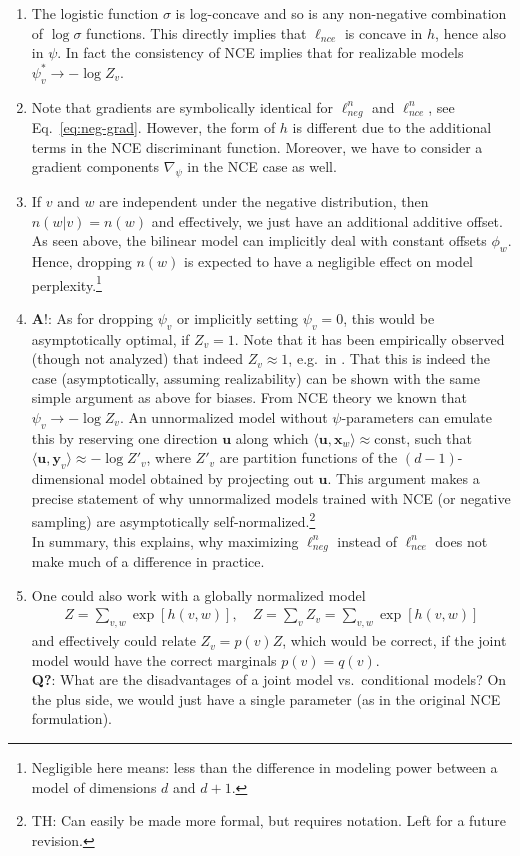 \documentclass{article}
\newcommand{\x}{{\mathbf x}}
\newcommand{\y}{{\mathbf y}}
\newcommand{\textbred}[1]{{\color{Red} \textbf #1}}
\begin{document}
\begin{enumerate}
\item The logistic function $\sigma$ is log-concave and so is any non-negative combination of $\log \sigma$ functions. This directly implies that $\ell_{nce}$ is concave in $h$, hence also in $\psi$. In fact the consistency of NCE  implies that for realizable models $\psi^*_v \to -\log Z_v$. 
\item Note that gradients are symbolically identical for $\ell^n_{neg}$ and $\ell^n_{nce}$, see Eq.~\eqref{eq:neg-grad}. However, the form of $h$ is different due to the additional terms in the NCE discriminant function. Moreover, we have to consider a gradient components $\nabla_\psi$ in the NCE case as well.
\item If $v$ and $w$ are independent under the negative distribution, then $n(w|v) = n(w)$ and effectively, we just have an additional additive offset.  As seen above, the bilinear model can implicitly deal with constant offsets $\phi_w$. Hence, dropping $n(w)$ is expected to have a negligible effect on model perplexity.\footnote{Negligible here means: less than the difference in modeling power between a model of dimensions $d$ and $d+1$.}
\item \textbred{A!}: As for dropping $\psi_v$ or  implicitly setting $\psi_v=0$, this would be asymptotically optimal, if $Z_v=1$. Note that it has been empirically observed  (though not analyzed) that indeed $Z_v \approx 1$, e.g.~in \cite{mnih2012fast}. That this is indeed the case (asymptotically, assuming realizability) can be shown with the same simple argument as above for biases. From NCE theory we known that $\psi_v \to - \log Z_v$. An unnormalized model without $\psi$-parameters can emulate this by reserving one direction $\mathbf u$ along which $\langle \mathbf u, \x_w\rangle \approx \text{const}$, such that $\langle \mathbf u, \y_v \rangle \approx - \log Z'_v$, where $Z'_v$ are partition functions of the $(d-1)$-dimensional model obtained by projecting out $\mathbf u$. This argument makes a precise statement of why unnormalized models trained with NCE (or negative sampling) are asymptotically self-normalized.\footnote{TH: Can easily be made more formal, but requires notation. Left for a future revision.}
\\[2mm]
In summary, this explains, why maximizing $\ell_{neg}^n$ instead of $\ell_{nce}^n$ does not make much of a difference in practice. 
\item One could also work with a globally normalized model
\begin{align}
Z = \sum_{v,w} \exp[h(v,w)], \quad Z = \sum_v Z_v = \sum_{v,w} \exp[h(v,w)]
\end{align}
and effectively could relate $Z_v = p(v) Z$, which would be correct, if the joint model would have the correct marginals $p(v) = q(v)$.  \\[2mm]
\textbf{Q?}: What are the disadvantages of a joint model vs.~conditional models?  On the plus side, we would just have a single parameter (as in the original NCE formulation). 
\end{enumerate}
\end{document}

